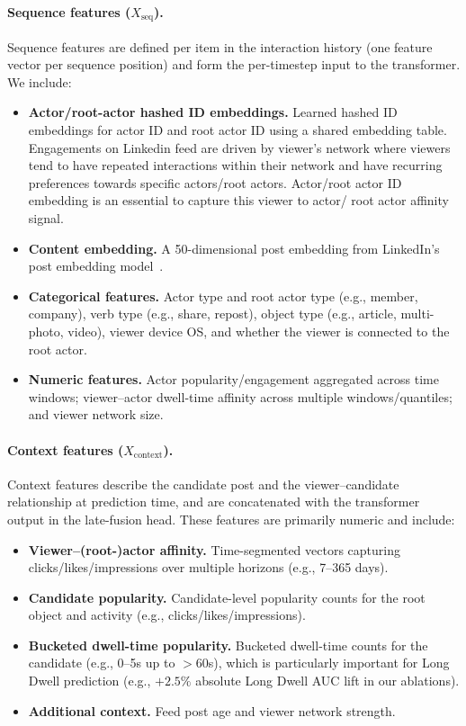 \documentclass[sigconf]{acmart}
\begin{document}
\paragraph{Sequence features ($X_{\text{seq}}$).}
Sequence features are defined per item in the interaction history (one feature vector per sequence position) and form the per-timestep input to the transformer. We include:
\begin{itemize}
    \item \textbf{Actor/root-actor hashed ID embeddings.} Learned hashed ID embeddings for actor ID and root actor ID using a shared embedding table. Engagements on Linkedin feed are driven by viewer's network where viewers tend to have repeated interactions within their network and have recurring preferences towards specific actors/root actors. Actor/root actor ID embedding is an essential to capture this viewer to actor/ root actor affinity signal.
    \item \textbf{Content embedding.} A 50-dimensional post embedding from LinkedIn's post embedding model~\cite{srinivasa2025linkedin}.
    \item \textbf{Categorical features.} Actor type and root actor type (e.g., member, company), verb type (e.g., share, repost), object type (e.g., article, multi-photo, video), viewer device OS, and whether the viewer is connected to the root actor.
    \item \textbf{Numeric features.} Actor popularity/engagement aggregated across time windows; viewer--actor dwell-time affinity across multiple windows/quantiles; and viewer network size.
\end{itemize}

\paragraph{Context features ($X_{\text{context}}$).}
Context features describe the candidate post and the viewer--candidate relationship at prediction time, and are concatenated with the transformer output in the late-fusion head. These features are primarily numeric and include:
\begin{itemize}
    \item \textbf{Viewer--(root-)actor affinity.} Time-segmented vectors capturing clicks/likes/impressions over multiple horizons (e.g., 7--365 days).
    \item \textbf{Candidate popularity.} Candidate-level popularity counts for the root object and activity (e.g., clicks/likes/impressions).
    \item \textbf{Bucketed dwell-time popularity.} Bucketed dwell-time counts for the candidate (e.g., 0--5s up to $>$60s), which is particularly important for Long Dwell prediction (e.g., $+2.5\%$ absolute Long Dwell AUC lift in our ablations).
    \item \textbf{Additional context.} Feed post age and viewer network strength.
\end{itemize}
\end{document}
